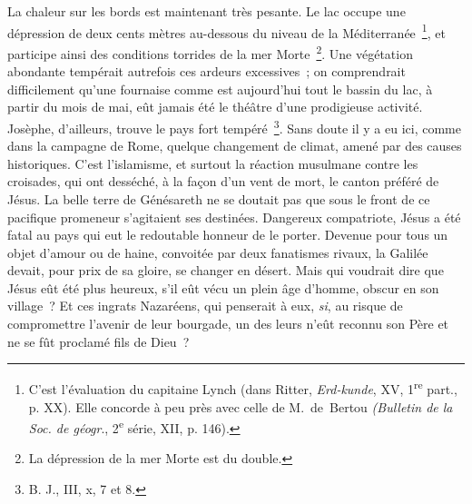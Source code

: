 \documentclass[french,twoside]{book} %
\begin{document}
La chaleur sur les bords est maintenant très pesante. Le lac occupe une dépression de deux cents mètres au-dessous du niveau de la Méditerranée \footnote{ C’est l’évaluation du capitaine Lynch (dans Ritter, {\itshape Erd-kunde}, XV, 1\textsuperscript{re} part., p. XX). Elle concorde à peu près avec celle de M. de Bertou {\itshape (Bulletin de la Soc. de géogr}., 2\textsuperscript{e} série, XII, p. 146).}, et participe ainsi des conditions torrides de la mer Morte \footnote{La dépression de la mer Morte est du double.}. Une végétation abondante tempérait autrefois ces ardeurs excessives ; on comprendrait difficilement qu’une fournaise comme est aujourd’hui tout le bassin du lac, à partir du mois de mai, eût jamais été le théâtre d’une prodigieuse activité. Josèphe, d’ailleurs, trouve le pays fort tempéré \footnote{ B. J., III, x, 7 et 8.}. Sans doute il y a eu ici, comme dans la campagne de Rome, quelque changement de climat, amené par des causes historiques. C’est l’islamisme, et surtout la réaction musulmane contre les croisades, qui ont desséché, à la façon d’un vent de mort, le canton préféré de Jésus. La belle terre de Génésareth ne se doutait pas que sous le front de ce pacifique promeneur s’agitaient ses destinées. Dangereux compatriote, Jésus a été fatal au pays qui eut le redoutable honneur de le porter. Devenue pour tous un objet d’amour ou de haine, convoitée par deux fanatismes rivaux, la Galilée devait, pour prix de sa gloire, se changer en désert. Mais qui voudrait dire que Jésus eût été plus heureux, s’il eût vécu un plein âge d’homme, obscur en son village ? Et ces ingrats Nazaréens, qui penserait à eux, {\itshape si}, au risque de compromettre l’avenir de leur bourgade, un des leurs n’eût reconnu son Père et ne se fût proclamé fils de Dieu ?\par
\end{document}
